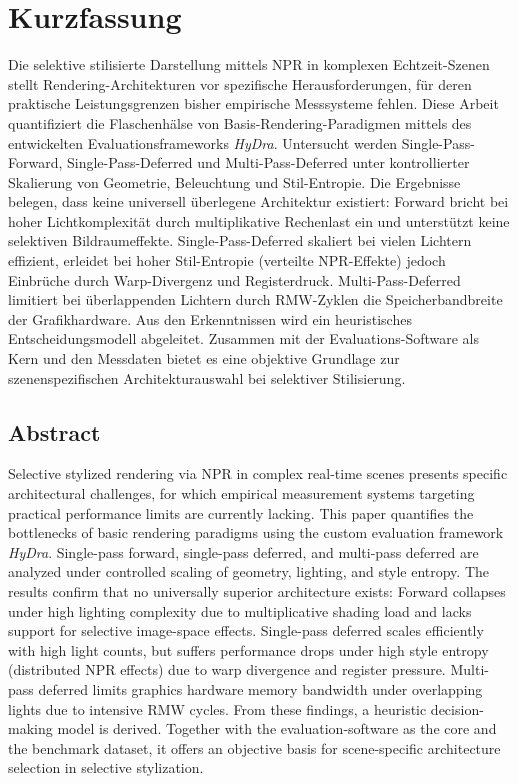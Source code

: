\chapter*{Kurzfassung}

Die selektive stilisierte Darstellung mittels \ac{NPR} in komplexen Echtzeit-Szenen stellt Rendering-Architekturen vor
spezifische Herausforderungen, für deren praktische Leistungsgrenzen bisher empirische Messsysteme fehlen.
Diese Arbeit quantifiziert die Flaschenhälse von Basis-Rendering-Paradigmen mittels des entwickelten
Evaluationsframeworks \textit{\acs{HyDra}}.
Untersucht werden Single-Pass-Forward, Single-Pass-Deferred und Multi-Pass-Deferred unter kontrollierter Skalierung von
Geometrie, Beleuchtung und Stil-Entropie.
Die Ergebnisse belegen, dass keine universell überlegene Architektur existiert:
Forward bricht bei hoher Lichtkomplexität durch multiplikative Rechenlast ein und unterstützt keine selektiven
Bildraumeffekte.
Single-Pass-Deferred skaliert bei vielen Lichtern effizient, erleidet bei hoher Stil-Entropie
(verteilte \ac{NPR}-Effekte) jedoch Einbrüche durch Warp-Divergenz und Registerdruck.
Multi-Pass-Deferred limitiert bei überlappenden Lichtern durch \ac{RMW}-Zyklen die Speicherbandbreite der Grafikhardware.
Aus den Erkenntnissen wird ein heuristisches Entscheidungsmodell abgeleitet.
Zusammen mit der Evaluations-Software als Kern und den Messdaten bietet es eine objektive Grundlage zur
szenenspezifischen Architekturauswahl bei selektiver Stilisierung.

\vspace{-0.5em}


\section*{Abstract}

Selective stylized rendering via \ac{NPR} in complex real-time scenes presents specific architectural challenges,
for which empirical measurement systems targeting practical performance limits are currently lacking.
This paper quantifies the bottlenecks of basic rendering paradigms using the custom evaluation framework
\textit{\acs{HyDra}}.
Single-pass forward, single-pass deferred, and multi-pass deferred are analyzed under controlled scaling of
geometry, lighting, and style entropy.
The results confirm that no universally superior architecture exists:
Forward collapses under high lighting complexity due to multiplicative shading load and lacks support for selective
image-space effects.
Single-pass deferred scales efficiently with high light counts, but suffers performance drops under high style
entropy (distributed \ac{NPR} effects) due to warp divergence and register pressure.
Multi-pass deferred limits graphics hardware memory bandwidth under overlapping lights due to intensive \ac{RMW} cycles.
From these findings, a heuristic decision-making model is derived.
Together with the evaluation-software as the core and the benchmark dataset, it offers an objective basis for
scene-specific architecture selection in selective stylization.

\acresetall

